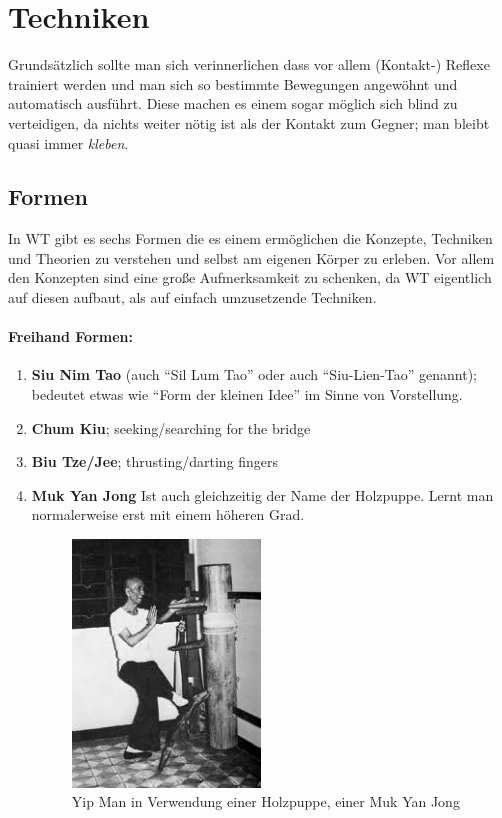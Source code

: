 \documentclass[a4paper,12pt]{scrartcl}
\begin{document}
\newpage
\section{Techniken}

Grunds\"atzlich sollte man sich verinnerlichen dass vor allem (Kontakt-) Reflexe trainiert werden und man sich so bestimmte Bewegungen angew\"ohnt und automatisch ausf\"uhrt. Diese machen es einem sogar m\"oglich sich blind zu verteidigen, da nichts weiter n\"otig ist als der Kontakt zum Gegner; man bleibt quasi immer \textit{kleben}.

\subsection{Formen}

In WT gibt es sechs Formen die es einem erm\"oglichen die Konzepte, Techniken und Theorien zu verstehen und selbst am eigenen K\"orper zu erleben. Vor allem den Konzepten sind eine gro{\ss}e Aufmerksamkeit zu schenken, da WT eigentlich auf diesen aufbaut, als auf einfach umzusetzende Techniken.

\paragraph{Freihand Formen:}
\begin{enumerate}
	\item \textbf{Siu Nim Tao} (auch ``Sil Lum Tao'' oder auch ``Siu-Lien-Tao'' genannt); bedeutet etwas wie ``Form der kleinen Idee'' im Sinne von Vorstellung.
	\item \textbf{Chum Kiu}; seeking/searching for the bridge
	\item \textbf{Biu Tze/Jee}; thrusting/darting fingers
	\item \textbf{Muk Yan Jong} Ist auch gleichzeitig der Name der Holzpuppe. Lernt man normalerweise erst mit einem h\"oheren Grad.

\begin{figure}[h]
	\centering
	\includegraphics[width=5cm]{image/wooden_dummy}
	\caption{Yip Man in Verwendung einer Holzpuppe, einer Muk Yan Jong}
	\label{img:wooden_dummy}
\end{figure}

\end{enumerate}
\end{document}

